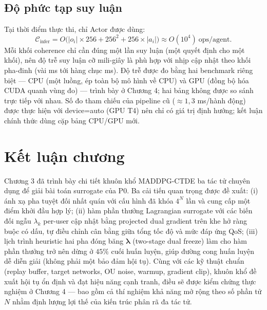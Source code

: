 \subsection{Độ phức tạp suy luận}

Tại thời điểm thực thi, chỉ Actor được dùng:
\begin{equation}
\mathcal{C}_{\text{infer}} = O\!\big(|o_i| \times 256 + 256^2 + 256 \times |a_i|\big)
                            \approx O(10^4)\ \text{ops/agent}.
\end{equation}
Mỗi khối coherence chỉ cần đúng một lần suy luận (một quyết định cho
một khối), nên độ trễ suy luận cỡ mili-giây là phù hợp với nhịp cập
nhật theo khối pha-đinh (vài ms tới hàng chục ms). Độ trễ được đo bằng
hai benchmark riêng biệt --- CPU (một luồng, ép toàn bộ mô hình về CPU)
và GPU (đồng bộ hóa CUDA quanh vùng đo) --- trình bày ở Chương 4; hai
bảng không được so sánh trực tiếp với nhau. Số đo tham chiếu của
pipeline cũ ($\approx 1{,}3$ ms/hành động) được thực hiện với
device=auto (GPU T4) nên chỉ có giá trị định hướng; kết luận chính
thức dùng cặp bảng CPU/GPU mới.

\section*{Kết luận chương}

Chương 3 đã trình bày chi tiết khuôn khổ MADDPG-CTDE ba tác tử chuyên
dụng để giải bài toán surrogate của P0. Ba cải tiến quan trọng được đề
xuất: (i) ánh xạ pha tuyệt đối nhất quán với cấu hình đã khóa
$4^N$ lần và cung cấp một điểm khởi đầu hợp lý; (ii) hàm phần thưởng
Lagrangian surrogate với các biến đối ngẫu $\lambda_k$ per-user cập
nhật bằng projected dual gradient trên khe hở ràng buộc có dấu, tự điều
chỉnh cân bằng giữa tổng tốc độ và mức đáp ứng QoS; (iii) lịch trình
heuristic hai pha đóng băng $\boldsymbol{\lambda}$ (two-stage dual
freeze) làm cho hàm phần thưởng trở nên dừng ở $45\%$ cuối huấn luyện,
giúp đường cong huấn luyện dễ diễn giải (không phải một bảo đảm hội
tụ). Cùng với các
kỹ thuật chuẩn (replay buffer, target networks, OU noise, warmup,
gradient clip), khuôn khổ đề xuất hội tụ ổn định và đạt hiệu năng
cạnh tranh, điều sẽ được kiểm chứng thực nghiệm ở Chương 4 --- bao gồm
cả thí nghiệm khả năng mở rộng theo số phần tử $N$ nhằm định lượng
lợi thế của kiến trúc phân rã đa tác tử.
